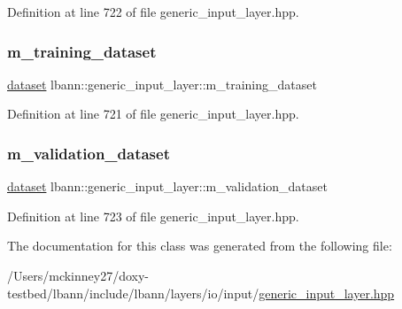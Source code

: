 Definition at line 722 of file generic\+\_\+input\+\_\+layer.\+hpp.

\mbox{\label{classlbann_1_1generic__input__layer_a23716635b1062bfe57f7fcf75140a63a}} 
\subsubsection{\texorpdfstring{m\+\_\+training\+\_\+dataset}{m\_training\_dataset}}
{\footnotesize\ttfamily \hyperlink{classlbann_1_1dataset}{dataset} lbann\+::generic\+\_\+input\+\_\+layer\+::m\+\_\+training\+\_\+dataset\hspace{0.3cm}{\ttfamily [protected]}}



Definition at line 721 of file generic\+\_\+input\+\_\+layer.\+hpp.

\mbox{\label{classlbann_1_1generic__input__layer_abd70adf607d1cef87fb6641af77e816d}} 
\subsubsection{\texorpdfstring{m\+\_\+validation\+\_\+dataset}{m\_validation\_dataset}}
{\footnotesize\ttfamily \hyperlink{classlbann_1_1dataset}{dataset} lbann\+::generic\+\_\+input\+\_\+layer\+::m\+\_\+validation\+\_\+dataset\hspace{0.3cm}{\ttfamily [protected]}}



Definition at line 723 of file generic\+\_\+input\+\_\+layer.\+hpp.



The documentation for this class was generated from the following file\+:\begin{DoxyCompactItemize}
\item 
/\+Users/mckinney27/doxy-\/testbed/lbann/include/lbann/layers/io/input/\hyperlink{generic__input__layer_8hpp}{generic\+\_\+input\+\_\+layer.\+hpp}\end{DoxyCompactItemize}
